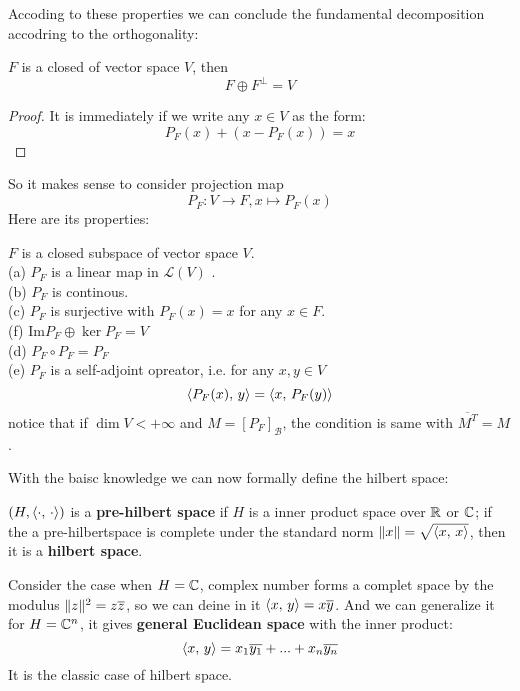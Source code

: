 \documentclass[en,geye,blue,normal,12pt,bibend=bibtex]{elegantnote}
\begin{document}
Accoding to these properties we can conclude the fundamental decomposition accodring to the orthogonality:
\begin{theorem}
    \(F\) is a closed of vector space \(V\), then
    \[F \oplus F^\perp = V\]

    \begin{proof}
        It is immediately if we write any \(x \in V\) as the form:
        \[P_F(x) + (x-P_F(x))  = x\]
    \end{proof}
\end{theorem}
So it makes sense to consider projection map
\[P_F: V \to F, x \mapsto P_F(x)\]
Here are its properties:
\begin{proposition}
    \(F\) is a closed subspace of vector space \(V\).\\
    (a) \(P_F\) is a linear map in \(\mathcal{L}(V) \) \(\).\\
    (b) \(P_F\) is continous.\\
    (c) \(P_F\) is surjective with \(P_F(x)=x\) for any \(x \in F\).\\
    (f) \(\mathrm{Im}P_F  \oplus \ker P_F = V\)\\
    (d) \(P_F\circ P_F = P_F\)\\
    (e) \(P_F\) is a self-adjoint opreator, i.e. for any \(x,y \in V\)
    \[\left\langle P_F(x),\, y \right\rangle = \left\langle x,\, P_F(y) \right\rangle\]
    notice that if \(\dim V <+\infty\) and \(M =[P_F]_\mathcal{B} \), the condition is same with \(\overline{M^T}=M\).
\end{proposition}

With the baisc knowledge we can now formally define the hilbert space:
\begin{definition}
    \((H,\left\langle \cdot,\, \cdot \right\rangle)\) is a \textbf{pre-hilbert space} if \(H\) is a inner product space over \(\mathbb{R}\) or \(\mathbb{C}\); if the a pre-hilbertspace is complete under the standard norm \(\|x\|=\sqrt{\left\langle x,\, x \right\rangle}\), then it is a \textbf{hilbert space}.
\end{definition}

\begin{example}
    Consider the case when \(H = \mathbb{C}\), complex number forms a complet space by the modulus \(\|z\|^2 =z\overline{z}\), so we can deine in it \(\left\langle x,\, y \right\rangle = x\overline{y} \). And we can generalize it for \(H = \mathbb{C}^n\), it gives \textbf{general Euclidean space} with the inner product:
    \[\left\langle x,\, y \right\rangle = x_1\overline{y_1}+...+x_n\overline{y_n}\]
    It is the classic case of hilbert space.
\end{example}
\end{document}
